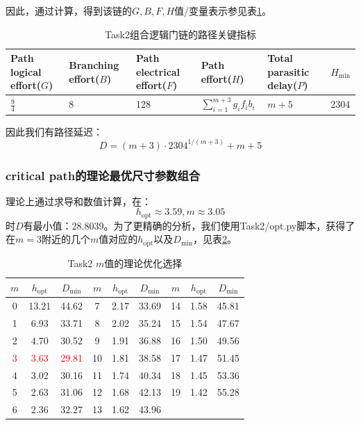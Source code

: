 \documentclass[UTF8,12pt,a4paper]{ctexart}
\begin{document}
因此，通过计算，得到该链的$G,B,F,H$值/变量表示参见表\ref{tab:task2_path_metrics}。

\begin{table}[htbp]
    \centering
    \caption{Task2组合逻辑门链的路径关键指标}
    \label{tab:task2_path_metrics}
    \begin{tabularx}{\linewidth}{XXXXXX}
    \toprule
    Path logical effort($G$) & Branching effort($B$) &
    Path electrical effort($F$) & Path effort($H$) &
    Total parasitic delay($P$) & $H_{\text{min}}$ \\
    \midrule
    $\frac{9}{4}$ & 8 & 128 & $\sum_{i=1}^{m+3}{g_i f_i b_i}$ & $m+5$ & 2304  \\
    \bottomrule
    \end{tabularx}
\end{table}

因此我们有路径延迟：
$$D = (m+3) \cdot 2304^{1/(m+3)} + m + 5$$

\subsubsection{critical path的理论最优尺寸参数组合}

理论上通过求导和数值计算，在：
$$h_{\text{opt}} \approx 3.59, m \approx 3.05$$
时$D$有最小值：28.8039。为了更精确的分析，我们使用Task2/opt.py脚本，获得了在$m=3$附近的几个$m$值对应的$h_{\text{opt}}$以及$D_{\text{min}}$，见表\ref{tab:task2_m_opt}。
\begin{table}[htbp]
    \centering
    \caption{Task2 $m$值的理论优化选择}
    \label{tab:task2_m_opt}
    \begin{tabular}{ccc|ccc|ccc}
    \toprule
    $m$ & $h_{\text{opt}}$ & $D_{\text{min}}$ & 
    $m$ & $h_{\text{opt}}$ & $D_{\text{min}}$ & 
    $m$ & $h_{\text{opt}}$ & $D_{\text{min}}$ \\
    \midrule
    0 & 13.21 & 44.62 & 7 & 2.17 & 33.69 & 14 & 1.58 & 45.81 \\
    1 & 6.93 & 33.71 & 8 & 2.02 & 35.24 & 15 & 1.54 & 47.67 \\
    2 & 4.70 & 30.52 & 9 & 1.91 & 36.88 & 16 & 1.50 & 49.56 \\
    \textcolor{red}{3} & \textcolor{red}{3.63} & \textcolor{red}{29.81} & 10 & 1.81 & 38.58 & 17 & 1.47 & 51.45 \\
    4 & 3.02 & 30.16 & 11 & 1.74 & 40.34 & 18 & 1.45 & 53.36 \\
    5 & 2.63 & 31.06 & 12 & 1.68 & 42.13 & 19 & 1.42 & 55.28 \\
    6 & 2.36 & 32.27 & 13 & 1.62 & 43.96 & & & \\
    \bottomrule
    \end{tabular}
\end{table}
\end{document}
